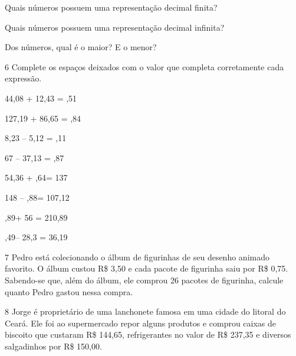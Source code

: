 \begin{escolha}
\item
  Quais números possuem uma representação decimal finita?


\item
  Quais números possuem uma representação decimal infinita?


\item
  Dos números, qual é o maior? E o menor?

\end{escolha}


\num{6} Complete os espaços deixados com o valor que completa corretamente cada expressão.

\begin{escolha}
\item
  44,08 + 12,43 = ,51\preencher
\item
  127,19 + 86,65 = ,84\preencher
\item
  8,23 -- 5,12 = ,11\preencher
\item
  67 -- 37,13 = ,87\preencher
\item
  54,36 + ,64\preencher = 137
\item
  148 -- ,88\preencher = 107,12
\item
  ,89\preencher + 56 = 210,89
\item
  ,49\preencher -- 28,3 = 36,19
\end{escolha}


\num{7} Pedro está colecionando o álbum de figurinhas de seu desenho
animado favorito. O álbum custou R\$ 3,50 e cada pacote de figurinha
saiu por R\$ 0,75. Sabendo-se que, além do álbum, ele comprou 26 pacotes
de figurinha, calcule quanto Pedro gastou nessa compra.



\num{8} Jorge é proprietário de uma lanchonete famosa em uma cidade do
litoral do Ceará. Ele foi ao supermercado repor alguns produtos e
comprou caixas de biscoito que custaram R\$ 144,65, refrigerantes no
valor de R\$ 237,35 e diversos salgadinhos por R\$ 150,00.

